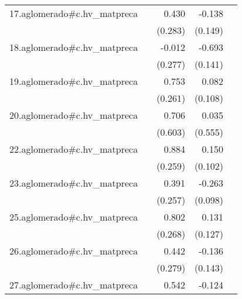 {\begin{longtable}{l*{4}{D{.}{.}{-1}}}
\addlinespace
17.aglomerado#c.hv\_matpreca&                     &       0.430         &      -0.138         &                     \\
            &                     &     (0.283)         &     (0.149)         &                     \\
\addlinespace
18.aglomerado#c.hv\_matpreca&                     &      -0.012         &      -0.693\sym{***}&                     \\
            &                     &     (0.277)         &     (0.141)         &                     \\
\addlinespace
19.aglomerado#c.hv\_matpreca&                     &       0.753\sym{**} &       0.082         &                     \\
            &                     &     (0.261)         &     (0.108)         &                     \\
\addlinespace
20.aglomerado#c.hv\_matpreca&                     &       0.706         &       0.035         &                     \\
            &                     &     (0.603)         &     (0.555)         &                     \\
\addlinespace
22.aglomerado#c.hv\_matpreca&                     &       0.884\sym{***}&       0.150         &                     \\
            &                     &     (0.259)         &     (0.102)         &                     \\
\addlinespace
23.aglomerado#c.hv\_matpreca&                     &       0.391         &      -0.263\sym{**} &                     \\
            &                     &     (0.257)         &     (0.098)         &                     \\
\addlinespace
25.aglomerado#c.hv\_matpreca&                     &       0.802\sym{**} &       0.131         &                     \\
            &                     &     (0.268)         &     (0.127)         &                     \\
\addlinespace
26.aglomerado#c.hv\_matpreca&                     &       0.442         &      -0.136         &                     \\
            &                     &     (0.279)         &     (0.143)         &                     \\
\addlinespace
27.aglomerado#c.hv\_matpreca&                     &       0.542\sym{*}  &      -0.124\sym{*}  &                     \\

\end{longtable}}
